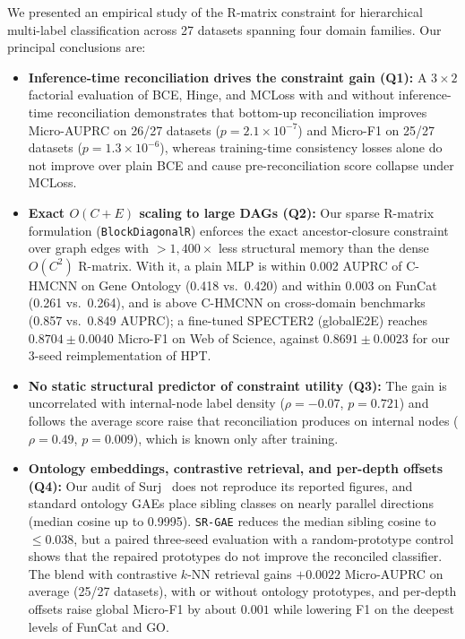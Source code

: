 \documentclass[preprint,12pt]{elsarticle}
\begin{document}
We presented an empirical study of the R-matrix constraint for hierarchical
multi-label classification across 27 datasets spanning four domain
families. Our principal conclusions are:
\begin{itemize}[leftmargin=*,nosep]
  \item \textbf{Inference-time reconciliation drives the constraint gain (Q1):}
    A $3 \times 2$ factorial evaluation of BCE, Hinge, and MCLoss with and
    without inference-time reconciliation demonstrates that bottom-up
    reconciliation improves Micro-AUPRC on 26/27 datasets ($p = 2.1\times
    10^{-7}$) and Micro-F1 on 25/27 datasets ($p = 1.3\times 10^{-6}$), whereas
    training-time consistency losses alone do not improve over plain BCE and
    cause pre-reconciliation score collapse under MCLoss.
  \item \textbf{Exact $O(C{+}E)$ scaling to large DAGs (Q2):} Our sparse
    R-matrix formulation (\texttt{BlockDiagonalR}) enforces the exact
    ancestor-closure constraint over graph edges with $>1{,}400\times$ less
    structural memory than the dense $O(C^2)$ R-matrix. With it, a plain MLP
    is within 0.002 AUPRC of C-HMCNN on Gene Ontology (0.418 vs.\ 0.420) and
    within 0.003 on FunCat (0.261 vs.\ 0.264), and is above C-HMCNN on
    cross-domain benchmarks (0.857 vs.\ 0.849 AUPRC); a fine-tuned SPECTER2
    (globalE2E) reaches $0.8704 \pm 0.0040$ Micro-F1 on Web of Science,
    against $0.8691 \pm 0.0023$ for our 3-seed reimplementation of HPT.
  \item \textbf{No static structural predictor of constraint utility (Q3):}
    The gain is uncorrelated with internal-node label density ($\rho =
    -0.07$, $p = 0.721$) and follows the average score raise that
    reconciliation produces on internal nodes ($\rho = 0.49$, $p = 0.009$),
    which is known only after training.
  \item \textbf{Ontology embeddings, contrastive retrieval, and per-depth
    offsets (Q4):} Our audit of Surj~\cite{www2022ontology} does not
    reproduce its reported figures, and standard ontology GAEs place sibling
    classes on nearly parallel directions (median cosine up to 0.9995).
    \texttt{SR-GAE} reduces the median sibling cosine to $\le 0.038$, but a
    paired three-seed evaluation with a random-prototype control shows that
    the repaired prototypes do not improve the reconciled classifier. The
    blend with contrastive $k$-NN retrieval gains $+0.0022$ Micro-AUPRC on
    average (25/27 datasets), with or without ontology prototypes, and
    per-depth offsets raise global Micro-F1 by about $0.001$ while lowering
    F1 on the deepest levels of FunCat and GO.
\end{itemize}
\end{document}

